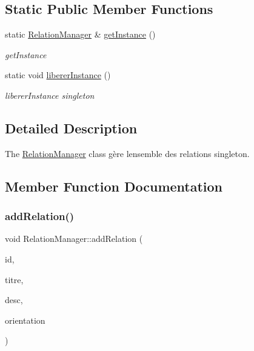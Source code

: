 \subsection*{Static Public Member Functions}
\begin{DoxyCompactItemize}
\item 
static \hyperlink{class_relation_manager}{Relation\+Manager} \& \hyperlink{class_relation_manager_a35c3622f29ccfbda84be848503041396}{get\+Instance} ()
\begin{DoxyCompactList}\small\item\em get\+Instance \end{DoxyCompactList}\item 
\mbox{\label{class_relation_manager_a64126ecfdd2046d9c9797e80427bcba3}} 
static void \hyperlink{class_relation_manager_a64126ecfdd2046d9c9797e80427bcba3}{liberer\+Instance} ()
\begin{DoxyCompactList}\small\item\em liberer\+Instance singleton \end{DoxyCompactList}\end{DoxyCompactItemize}


\subsection{Detailed Description}
The \hyperlink{class_relation_manager}{Relation\+Manager} class gère l\textquotesingle{}ensemble des relations singleton. 

\subsection{Member Function Documentation}
\mbox{\label{class_relation_manager_aa888ef6c6fe5842b178488fab0ffbec2}} 
\subsubsection{\texorpdfstring{add\+Relation()}{addRelation()}}
{\footnotesize\ttfamily void Relation\+Manager\+::add\+Relation (\begin{DoxyParamCaption}\item[{Q\+String}]{id,  }\item[{Q\+String}]{titre,  }\item[{Q\+String}]{desc,  }\item[{bool}]{orientation }\end{DoxyParamCaption})}



